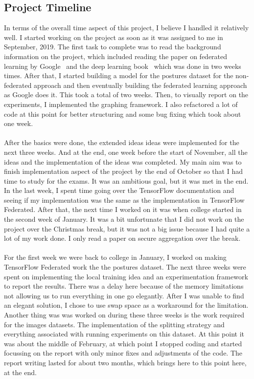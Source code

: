 \documentclass[12pt]{article}
\newcommand{\comment}[1]{}
\begin{document}
\subsection{Project Timeline}
\comment{
	reglection subsection
		what did I learn, new skills, short comings (skill, method, time)
	summary of project conduction
		timeline 
}
In terms of the overall time aspect of this project, I believe I handled it relatively well. I started working on the project as soon as it was assigned to me in September, 2019. The first task to complete was to read the background information on the project, which included reading the paper on federated learning by Google~\cite{mcmahan2016communication} and the deep learning book~\cite{deeplearning} which was done in two weeks times. After that, I started building a model for the postures dataset for the non-federated approach and then eventually building the federated learning approach as Google does it. This took a total of two weeks. Then, to visually report on the experiments, I implemented the graphing framework. I also refactored a lot of code at this point for better structuring and some bug fixing which took about one week.
\\\\
After the basics were done, the extended ideas ideas were implemented for the next three weeks. And at the end, one week before the start of November, all the ideas and the implementation of the ideas was completed. My main aim was to finish implementation aspect of the project by the end of October so that I had time to study for the exams. It was an ambitious goal, but it was met in the end. In the last week, I spent time going over the TensorFlow documentation and seeing if my implementation was the same as the implementation in TensorFlow Federated. After that, the next time I worked on it was when college started in the second week of January. It was a bit unfortunate that I did not work on the project over the Christmas break, but it was not a big issue because I had quite a lot of my work done. I only read a paper on secure aggregation over the break.
\\\\
For the first week we were back to college in January, I worked on making TensorFlow Federated work the the postures dataset. The next three weeks were spent on implementing the local training idea and an experimentation framework to report the results. There was a delay here because of the memory limitations not allowing us to run everything in one go elegantly. After I was unable to find an elegant solution, I chose to use swap space as a workaround for the limitation. Another thing was was worked on during these three weeks is the work required for the images datasets. The implementation of the splitting strategy and everything associated with running experiments on this dataset. At this point it was about the middle of February, at which point I stopped coding and started focussing on the report with only minor fixes and adjustments of the code. The report writing lasted for about two months, which brings here to this point here, at the end.
\comment{
	basic thing
	read book
	google implementation
	better graphinh 
	extended ideas
	repreodcuible
	testing
	results
	report - 2 months 
}
\clearpage
\printbibliography[title={Bibliography}]
\end{document}
